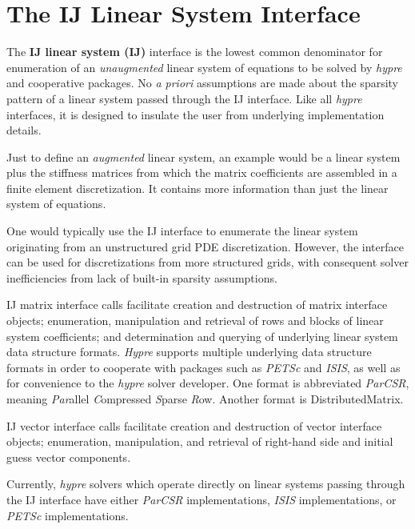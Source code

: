 \chapter{The IJ Linear System Interface}
\label{IJ}

The {\bf IJ linear system (IJ)} interface is the lowest common
denominator
for enumeration of an {\itshape unaugmented} linear system of equations
to be solved by {\slshape hypre} and cooperative packages.
No {\itshape a priori} assumptions are made about the sparsity
pattern of a linear system passed through the IJ interface.
Like all {\slshape hypre} interfaces, it is designed
to insulate the user from underlying implementation details.

Just to define an {\itshape augmented} linear system, an example would be
a linear system plus the stiffness matrices from which the matrix
coefficients are assembled in a finite element discretization.
It contains more information than just the linear system
of equations.

One would typically use the IJ interface to enumerate the linear
system originating from an unstructured grid PDE discretization.
However, the interface can be used for discretizations from more
structured grids, with consequent solver inefficiencies from lack
of built-in sparsity assumptions.

IJ matrix interface calls facilitate creation and destruction of 
matrix interface objects; enumeration, manipulation and retrieval
of rows and blocks of linear system coefficients; and determination
and querying of underlying linear system data structure formats.
{\slshape Hypre} supports multiple underlying data structure formats
in order to cooperate
with packages such as {\slshape PETSc} and {\slshape ISIS},
as well as for convenience to the {\slshape hypre} solver developer.
One format is abbreviated {\itshape ParCSR}, meaning {\itshape Par}allel
{\itshape C}ompressed {\itshape S}parse {\itshape R}ow.  Another format
is DistributedMatrix.

IJ vector interface calls facilitate creation and destruction of
vector interface objects; enumeration, manipulation, and retrieval
of right-hand side and initial guess vector components.

Currently, {\slshape hypre} solvers which operate directly on linear
systems passing through the IJ interface have either
{\itshape ParCSR} implementations, {\slshape ISIS} implementations,
or {\slshape PETSc} implementations.

